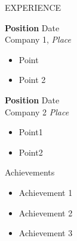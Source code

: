 \documentclass{resume}
\begin{document}
\begin{rSection}{EXPERIENCE}

\textbf{Position} \hfill Date\\
Company 1,   \hfill \textit{Place}


 \begin{itemize}
    \itemsep -2pt {} 
    
     \item Point 
     
     \item Point 2
   
    \end{itemize}
 
\textbf{Position} \hfill Date\\
Company 2  \hfill \textit{Place}


 \begin{itemize}
    \itemsep -2pt {} 
    
     \item Point1
     
     \item Point2
     
    \end{itemize}

\end{rSection} 



\begin{rSection}{Achievements} 
\begin{itemize}
    \item 	Achievement 1
    
    \item	Achievement 2
    
    \item	Achievement 3
    
\end{itemize}
\end{rSection}

\end{document}
